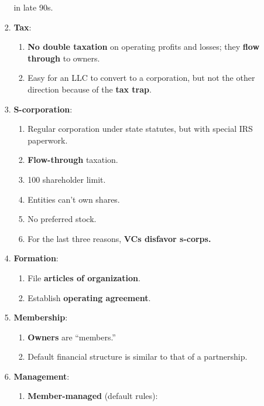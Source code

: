 \begin{enumerate}
\begin{enumerate}
\begin{enumerate}
            in late 90s.
            \item \textbf{Tax}:
            \begin{enumerate}
                \item \textbf{No double taxation} on operating profits and 
                losses; they \textbf{flow through} to owners.
                \item Easy for an LLC to convert to a corporation, but not the 
                other direction because of the \textbf{tax trap}.
            \end{enumerate}
            \item \textbf{S-corporation}:
            \begin{enumerate}
                \item Regular corporation under state statutes, but with 
                special IRS paperwork.
                \item \textbf{Flow-through} taxation.
                \item 100 shareholder limit.
                \item Entities can't own shares.
                \item No preferred stock.
                \item For the last three reasons, \textbf{VCs disfavor 
                s-corps.}
            \end{enumerate}
            \item \textbf{Formation}:
            \begin{enumerate}
                \item File \textbf{articles of organization}.
                \item Establish \textbf{operating agreement}.
            \end{enumerate}
            \item \textbf{Membership}:  
            \begin{enumerate}
                \item \textbf{Owners} are ``members.''
                \item Default financial structure is similar to that of a 
                partnership.
            \end{enumerate}
            \item \textbf{Management}:
            \begin{enumerate}
                \item \textbf{Member-managed} (default rules):
                \begin{itemize}

\end{itemize}
\end{enumerate}
\end{enumerate}
\end{enumerate}
\end{enumerate}
